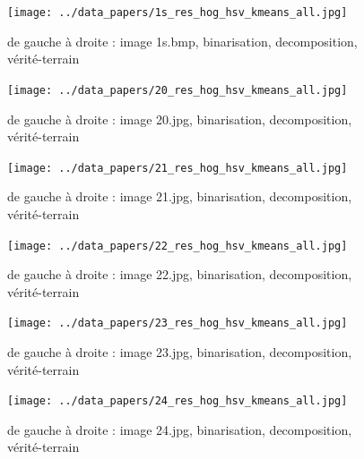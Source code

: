 \documentclass{book}
\begin{document}
\begin{figure}[H]
\begin{center}
\texttt{[image: ../data\_papers/1s\_res\_hog\_hsv\_kmeans\_all.jpg]}
\end{center}
\caption{de gauche à droite : image 1s.bmp, binarisation, decomposition, vérité-terrain}
\label{1s}
\end{figure}
\clearpage


\begin{figure}[H]
\begin{center}
\texttt{[image: ../data\_papers/20\_res\_hog\_hsv\_kmeans\_all.jpg]}
\end{center}
\caption{de gauche à droite : image 20.jpg, binarisation, decomposition, vérité-terrain}
\label{20}
\end{figure}
\clearpage


\begin{figure}[H]
\begin{center}
\texttt{[image: ../data\_papers/21\_res\_hog\_hsv\_kmeans\_all.jpg]}
\end{center}
\caption{de gauche à droite : image 21.jpg, binarisation, decomposition, vérité-terrain}
\label{21}
\end{figure}
\clearpage


\begin{figure}[H]
\begin{center}
\texttt{[image: ../data\_papers/22\_res\_hog\_hsv\_kmeans\_all.jpg]}
\end{center}
\caption{de gauche à droite : image 22.jpg, binarisation, decomposition, vérité-terrain}
\label{22}
\end{figure}
\clearpage


\begin{figure}[H]
\begin{center}
\texttt{[image: ../data\_papers/23\_res\_hog\_hsv\_kmeans\_all.jpg]}
\end{center}
\caption{de gauche à droite : image 23.jpg, binarisation, decomposition, vérité-terrain}
\label{23}
\end{figure}
\clearpage


\begin{figure}[H]
\begin{center}
\texttt{[image: ../data\_papers/24\_res\_hog\_hsv\_kmeans\_all.jpg]}
\end{center}
\caption{de gauche à droite : image 24.jpg, binarisation, decomposition, vérité-terrain}
\label{24}
\end{figure}
\clearpage
\end{document}
